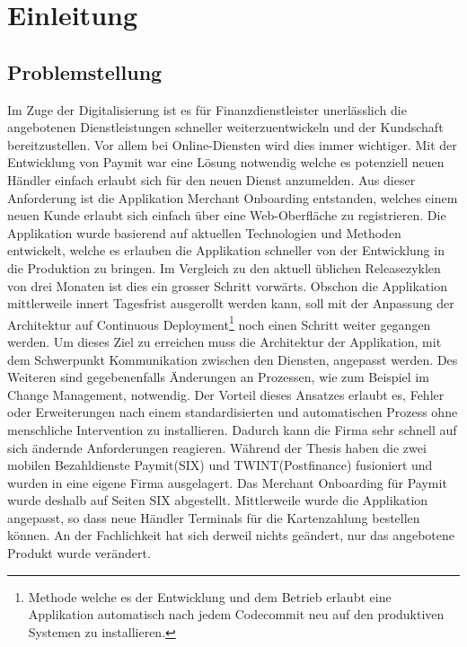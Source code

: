 \chapter{Einleitung}

\section{Problemstellung}

Im Zuge der Digitalisierung ist es für Finanzdienstleister unerlässlich die angebotenen Dienstleistungen schneller weiterzuentwickeln und der Kundschaft bereitzustellen. Vor allem bei Online-Diensten wird dies immer wichtiger. Mit der Entwicklung von Paymit war eine Lösung notwendig welche es potenziell neuen Händler einfach erlaubt sich für den neuen Dienst anzumelden. Aus dieser Anforderung ist die Applikation Merchant Onboarding entstanden, welches einem neuen Kunde erlaubt sich einfach über eine Web-Oberfläche zu registrieren. \newline
Die Applikation wurde basierend auf aktuellen Technologien und Methoden entwickelt, welche es erlauben die Applikation schneller von der Entwicklung in die Produktion zu bringen. Im Vergleich zu den aktuell üblichen Releasezyklen von drei Monaten ist dies ein grosser Schritt vorwärts.\newline
Obschon die Applikation mittlerweile innert Tagesfrist ausgerollt werden kann, soll mit der Anpassung der Architektur auf Continuous Deployment\footnote{Methode welche es der Entwicklung und dem Betrieb erlaubt eine Applikation automatisch nach jedem Codecommit neu auf den produktiven Systemen zu installieren.} noch einen Schritt weiter gegangen werden. Um dieses Ziel zu erreichen muss die Architektur der Applikation, mit dem Schwerpunkt Kommunikation zwischen den Diensten, angepasst werden. Des Weiteren sind gegebenenfalls Änderungen an Prozessen, wie zum Beispiel im Change Management, notwendig.
Der Vorteil dieses Ansatzes erlaubt es, Fehler oder Erweiterungen nach einem standardisierten und automatischen Prozess ohne menschliche Intervention zu installieren. Dadurch kann die Firma sehr schnell auf sich ändernde Anforderungen reagieren.\newline
Während der Thesis haben die zwei mobilen Bezahldienste Paymit(SIX) und TWINT(Postfinance) fusioniert und wurden in eine eigene Firma ausgelagert. Das Merchant Onboarding für Paymit wurde deshalb auf Seiten SIX abgestellt. Mittlerweile wurde die Applikation angepasst, so dass neue Händler Terminals für die Kartenzahlung bestellen können. An der Fachlichkeit hat sich derweil nichts geändert, nur das angebotene Produkt wurde verändert.\newline


